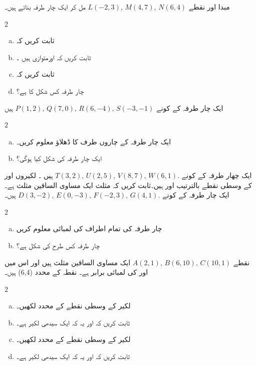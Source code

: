 مبدا    اور نقطے  \( L(-2,3), \, M(4,7), \, N(6,4) \) مل کر ایک چار طرفہ بناتے ہیں۔
\begin{multicols}{2}
\begin{enumerate}[a.]
\item
ثابت کریں کہ 
\item
ثابت کریں کہ     اورمتوازی ہیں ۔
\item
ثابت کریں کہ
\item
چار طرفہ     کس شکل کا ہے؟
\end{enumerate}
\end{multicols}
ایک چار طرفہ کے کونے \( P(1,2), \, Q(7,0), \, R(6,-4), \, S(-3,-1) \) ہیں 
\begin{multicols}{2}
\begin{enumerate}[a.]
\item
ایک چار طرفہ کے چاروں طرف کا ڈھلاؤ معلوم کریں۔
\item
ایک چار طرفہ   کی شکل کیا ہوگی؟
\end{enumerate}
\end{multicols}
ایک چھار طرفہ کے کونے \( T(3,2), \, U(2,5), \, V(8,7), \, W(6,1). \) ہیں ۔ لکیروں    اور        کے وسطی نقطے بالترتیب      اور      ہیں۔ثابت کریں کہ مثلث        ایک مساوی الساقین مثلث ہے۔      
%
ایک چار طرفہ کے کونے \( D(3,-2), \, E(0,-3), \, F(-2,3), \, G(4,1). \) ہیں۔
\begin{multicols}{2}
\begin{enumerate}[a.]
\item
چار طرفہ کی تمام اطراف کی لمبائی معلوم کریں
\item
چار طرفہ کس طرح کی شکل ہے؟
\end{enumerate}
\end{multicols}
نقطے  \( A(2,1), \, B(6,10), \, C(10,1) \) ایک مساوی الساقین مثلث   ہیں  اور اس میں     اور       کی لمبائی برابر ہے۔ نقطہ  کے  محدد  (6,4)   ہیں۔
\begin{multicols}{2}
\begin{enumerate}[a.]
\item
لکیر  کے  وسطی نقطے    کے محدد لکھیں۔
\item
ثابت کریں کہ       اور یہ کہ        ایک سیدھی لکیر ہے۔
\item
لکیر     کے وسطی نقطے     کے محدد لکھیں۔
\item
ثابت کریں کہ  اور یہ کہ  ایک سیدھی لکیر ہے۔
\end{enumerate}
\end{multicols}
